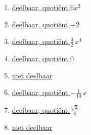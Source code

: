 \documentclass{ximera}
\begin{document}
\begin{Antwoord} \label{antw2.1}
\begin{enumerate}

\item
\hyperlink{oef2.1}{deelbaar, quotiënt $6x^2$} 
\item
\hyperlink{oef2.1}{deelbaar, quotiënt $-2$}
\item
\hyperlink{oef2.1}{deelbaar, quotiënt $\frac{3}{2}\,x^4$}
\item
\hyperlink{oef2.1}{deelbaar, quotiënt $0$}
\item
\hyperlink{oef2.1}{niet deelbaar}
\item
\hyperlink{oef2.1}{deelbaar, quotiënt $-\frac{1}{10}\,x$}
\item
\hyperlink{oef2.1}{deelbaar, quotiënt $\frac{\sqrt{2}}{6}$}
\item
\hyperlink{oef2.1}{niet deelbaar}
\end{enumerate}
\end{Antwoord}
\end{document}

